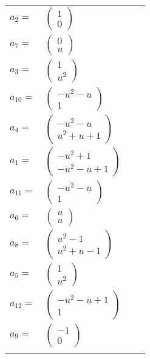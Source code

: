 \documentclass[1p]{elsarticle_modified}
\theoremstyle{definition}
\begin{document}
\begin{tabular}{m{7pt} m{180pt} m{7pt} m{180pt} }
\flushright $a_{2}=$&$\begin{pmatrix}1\\0\end{pmatrix}$ \\
\flushright $a_{7}=$&$\begin{pmatrix}0\\u\end{pmatrix}$ \\
\flushright $a_{3}=$&$\begin{pmatrix}1\\u^2\end{pmatrix}$ \\
\flushright $a_{10}=$&$\begin{pmatrix}- u^2- u\\1\end{pmatrix}$ \\
\flushright $a_{4}=$&$\begin{pmatrix}- u^2- u\\u^2+u+1\end{pmatrix}$ \\
\flushright $a_{1}=$&$\begin{pmatrix}- u^2+1\\- u^2- u+1\end{pmatrix}$ \\
\flushright $a_{11}=$&$\begin{pmatrix}- u^2- u\\1\end{pmatrix}$ \\
\flushright $a_{6}=$&$\begin{pmatrix}u\\u\end{pmatrix}$ \\
\flushright $a_{8}=$&$\begin{pmatrix}u^2-1\\u^2+u-1\end{pmatrix}$ \\
\flushright $a_{5}=$&$\begin{pmatrix}1\\u^2\end{pmatrix}$ \\
\flushright $a_{12}=$&$\begin{pmatrix}- u^2- u+1\\1\end{pmatrix}$ \\
\flushright $a_{9}=$&$\begin{pmatrix}-1\\0\end{pmatrix}$\\&\end{tabular}
\end{document}
